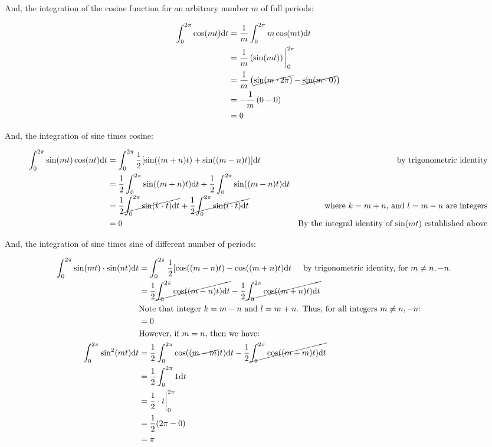 \documentclass[10pt]{article} %
\begin{document}
And, the integration of the cosine function for an arbitrary number $m$ of full periods:

\begin{align*}
    \int_0^{2\pi} \cos(mt)\mathrm{d}t & = \frac1m\int_0^{2\pi}m\cos(mt)\mathrm{d}t \\
    & = \frac1m\left(\sin(mt)\right)\bigg\rvert_0^{2\pi} \\
    & = \frac1m\left(\cancel{\sin(m\cdot2\pi)} - \cancel{\sin(m\cdot 0)}\right) \\
    & = -\frac1m\left(0 - 0\right) \\
    & = 0
\end{align*}

And, the integration of sine times cosine:

\begin{align*}
    \int_0^{2\pi}\sin(mt)\cos(nt)\mathrm{d}t & = \int_0^{2\pi}\frac12[\sin((m+n)t) +\sin((m-n)t)]\mathrm{d}t &\text{\hspace{0.5cm} by trigonometric identity} \\
    & = \frac12 \int_0^{2\pi}\sin((m+n)t)\mathrm{d}t + \frac12 \int_0^{2\pi}\sin((m-n)t)\mathrm{d}t\\
    & = \frac12 \cancel{\int_0^{2\pi}\sin(k\cdot t)\mathrm{d}t} + \frac12 \cancel{\int_0^{2\pi}\sin(l\cdot t)\mathrm{d}t} &\text{\hspace{0.5cm}  where $k=m+n$, and $l=m-n$ are integers}\\
    & = 0 &\text{By the integral identity of $\sin(mt)$ established above}
\end{align*}

And, the integration of sine times sine of different number of periods:

\begin{align*}
    \int_0^{2\pi} \sin(mt) \cdot \sin(nt) \mathrm{d}t &= \int_0^{2\pi}\frac12[\cos((m-n)t) - \cos((m+n)t) \mathrm{d}t \text{\hspace{0.5cm}by trigonometric identity, for $m \neq n, -n$.}&\\
    & =\frac12\cancel{\int_0^{2\pi}\cos((m-n)t)\mathrm{d}t} - \frac12\cancel{\int_0^{2\pi}\cos((m+n)t)\mathrm{d}t}\\
    & \text{Note that integer $k = m-n$ and $l = m+n$. Thus, for all integers $m \neq n, -n$:} &\\
    & = 0 \\
    & \text{However, if $m = n$, then we have:}\\
    \int_0^{2\pi} \sin^2(mt)\mathrm{d}t & = \frac12\int_0^{2\pi}\cos((\cancel{m-m})t)\mathrm{d}t - \frac12\cancel{\int_0^{2\pi}\cos((m+m)t)\mathrm{d}t}\\
    & = \frac12\int_0^{2\pi}1\mathrm{d}t\\
    & = \frac12 \cdot t \bigg\rvert_0^{2\pi} \\
    & = \frac12 (2\pi - 0) \\
    & = \pi
\end{align*}
\end{document}
